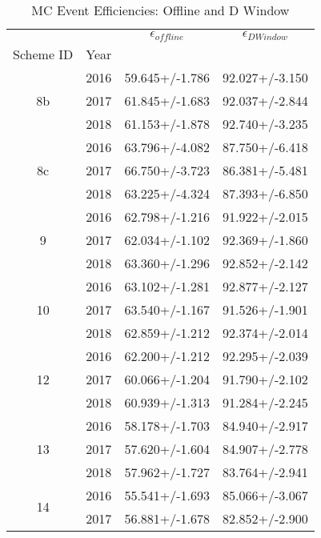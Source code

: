 \begin{table}
\centering
\caption{MC Event Efficiencies: Offline and D Window}
\label{tab:event_offdwin_2}
\begin{tabular}{cccc}
\toprule
   &      & $\epsilon_{offline}$ & $\epsilon_{D Window}$ \\
Scheme ID & Year &                      &                       \\
\midrule
\multirow{3}{*}{8b} & 2016 &       59.645+/-1.786 &        92.027+/-3.150 \\
   & 2017 &       61.845+/-1.683 &        92.037+/-2.844 \\
   & 2018 &       61.153+/-1.878 &        92.740+/-3.235 \\
\cline{1-4}
\multirow{3}{*}{8c} & 2016 &       63.796+/-4.082 &        87.750+/-6.418 \\
   & 2017 &       66.750+/-3.723 &        86.381+/-5.481 \\
   & 2018 &       63.225+/-4.324 &        87.393+/-6.850 \\
\cline{1-4}
\multirow{3}{*}{9} & 2016 &       62.798+/-1.216 &        91.922+/-2.015 \\
   & 2017 &       62.034+/-1.102 &        92.369+/-1.860 \\
   & 2018 &       63.360+/-1.296 &        92.852+/-2.142 \\
\cline{1-4}
\multirow{3}{*}{10} & 2016 &       63.102+/-1.281 &        92.877+/-2.127 \\
   & 2017 &       63.540+/-1.167 &        91.526+/-1.901 \\
   & 2018 &       62.859+/-1.212 &        92.374+/-2.014 \\
\cline{1-4}
\multirow{3}{*}{12} & 2016 &       62.200+/-1.212 &        92.295+/-2.039 \\
   & 2017 &       60.066+/-1.204 &        91.790+/-2.102 \\
   & 2018 &       60.939+/-1.313 &        91.284+/-2.245 \\
\cline{1-4}
\multirow{3}{*}{13} & 2016 &       58.178+/-1.703 &        84.940+/-2.917 \\
   & 2017 &       57.620+/-1.604 &        84.907+/-2.778 \\
   & 2018 &       57.962+/-1.727 &        83.764+/-2.941 \\
\cline{1-4}
\multirow{3}{*}{14} & 2016 &       55.541+/-1.693 &        85.066+/-3.067 \\
   & 2017 &       56.881+/-1.678 &        82.852+/-2.900 \\

\end{tabular}
\end{table}
